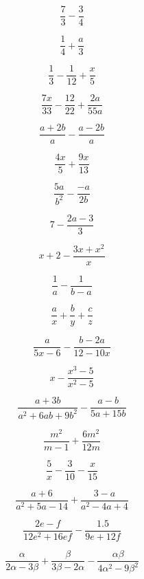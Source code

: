 \begin{bbwAufgabenBlock}
\item $$\frac73 - \frac34$$

\item $$\frac14 + \frac{a}{3}$$

\item $$\frac13 - \frac1{12} + \frac{x}5$$

\item $$\frac{7x}{33} - \frac{12}{22} + \frac{2a}{55a}$$

\item $$\frac{a+2b}{a} - \frac{a-2b}{a}$$

\item $$\frac{4x}5 + \frac{9x}{13}$$

\item $$\frac{5a}{b^2} - \frac{-a}{2b}$$

\item $$7 - \frac{2a-3}3 $$

\item $$x + 2 - \frac{3x+x^2}{x}$$

\item $$\frac1a - \frac1{b-a}$$

\item $$\frac{a}x + \frac{b}y + \frac{c}z$$

\item $$\frac{a}{5x-6} - \frac{b-2a}{12-10x}$$

\item $$x - \frac{x^3-5}{x^2-5}$$

\item $$\frac{a+3b}{a^2+6ab+9b^2} - \frac{a-b}{5a+15b}$$

\item $$\frac{m^2}{m-1} + \frac{6m^2}{12m}$$

\item $$\frac5x - \frac3{10} - \frac{x}{15}$$

\item $$\frac{a+6}{a^2+5a-14} + \frac{3-a}{a^2-4a+4}$$
 
\item $$\frac{2e-f}{12e^2+16ef} - \frac{1.5}{9e+12f}$$

\item $$\frac{\alpha}{2\alpha -3\beta} + \frac{\beta}{3\beta-2\alpha}
- \frac{\alpha\beta}{4\alpha^2 - 9\beta^2}$$


\end{bbwAufgabenBlock}
